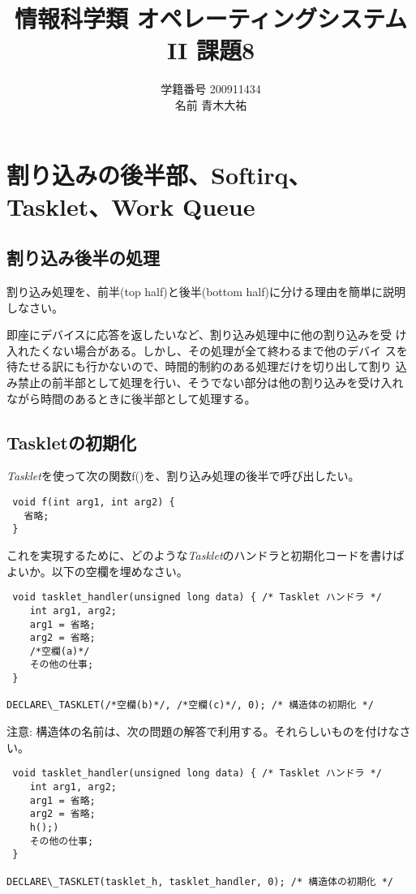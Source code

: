 \documentclass[a4j,9pt]{jsarticle}
\title{情報科学類 オペレーティングシステムII 課題8}
\author{学籍番号 200911434 \\ 名前 青木大祐}
\begin{document}
\maketitle
\setcounter{section}{7}
\section{割り込みの後半部、Softirq、Tasklet、Work Queue}
\setcounter{subsection}{800}
\subsection{割り込み後半の処理}
\begin{screen}
 割り込み処理を、前半(top half)と後半(bottom half)に分ける理由を簡単に説明しなさい。
\end{screen}
即座にデバイスに応答を返したいなど、割り込み処理中に他の割り込みを受
け入れたくない場合がある。しかし、その処理が全て終わるまで他のデバイ
スを待たせる訳にも行かないので、時間的制約のある処理だけを切り出して割り
込み禁止の前半部として処理を行い、そうでない部分は他の割り込みを受け入れ
ながら時間のあるときに後半部として処理する。

\subsection{Taskletの初期化}
\begin{screen}
{\itshape Tasklet}を使って次の関数{\ttfamily f()}を、割り込み処理の後半で呼び出したい。
\begin{lstlisting}
 void f(int arg1, int arg2) {
   省略;
 }
\end{lstlisting}
これを実現するために、どのような{\itshape Tasklet}のハンドラと初期化コードを書けばよいか。以下の空欄を埋めなさい。
\begin{lstlisting}
 void tasklet_handler(unsigned long data) { /* Tasklet ハンドラ */
    int arg1, arg2;
    arg1 = 省略;
    arg2 = 省略;
    /*空欄(a)*/
    その他の仕事;
 }

DECLARE\_TASKLET(/*空欄(b)*/, /*空欄(c)*/, 0); /* 構造体の初期化 */
\end{lstlisting}
注意: 構造体の名前は、次の問題の解答で利用する。それらしいものを付けなさい。
\end{screen}

\begin{lstlisting}
 void tasklet_handler(unsigned long data) { /* Tasklet ハンドラ */
    int arg1, arg2;
    arg1 = 省略;
    arg2 = 省略;
    h();)
    その他の仕事;
 }

DECLARE\_TASKLET(tasklet_h, tasklet_handler, 0); /* 構造体の初期化 */
\end{lstlisting}
\end{document}
